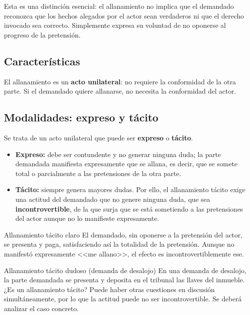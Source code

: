 \documentclass[12pt,oneside]{book}
\begin{document}
Esta es una distinción esencial: el allanamiento no implica que el demandado reconozca que los hechos alegados por el actor sean verdaderos ni que el derecho invocado sea correcto. Simplemente expresa su voluntad de no oponerse al progreso de la pretensión.

\subsection{Características}

El allanamiento es un \textbf{acto unilateral}: no requiere la conformidad de la otra parte. Si el demandado quiere allanarse, no necesita la conformidad del actor.

\subsection{Modalidades: expreso y tácito}

Se trata de un acto unilateral que puede ser \textbf{expreso} o \textbf{tácito}.

\begin{itemize}
    \item \textbf{Expreso:} debe ser contundente y no generar ninguna duda; la parte demandada manifiesta expresamente que se allana, es decir, que se somete total o parcialmente a las pretensiones de la otra parte.
    \item \textbf{Tácito:} siempre genera mayores dudas. Por ello, el allanamiento tácito exige una actitud del demandado que no genere ninguna duda, que sea \textbf{incontrovertible}, de la que surja que se está sometiendo a las pretensiones del actor aunque no lo manifieste expresamente.
\end{itemize}

\begin{example}{Allanamiento tácito claro}
El demandado, sin oponerse a la pretensión del actor, se presenta y paga, satisfaciendo así la totalidad de la pretensión. Aunque no manifestó expresamente <<me allano>>, el efecto es incontrovertiblemente ese.
\end{example}

\begin{example}{Allanamiento tácito dudoso (demanda de desalojo)}
En una demanda de desalojo, la parte demandada se presenta y deposita en el tribunal las llaves del inmueble. ¿Es un allanamiento tácito? Puede haber otras cuestiones en discusión simultáneamente, por lo que la actitud puede no ser incontrovertible. Se deberá analizar el caso concreto.
\end{example}
\end{document}
